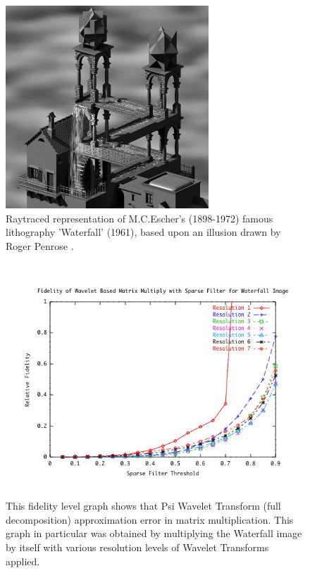 
\begin{figure}[ht]
\begin{center}\includegraphics [width=3in]{waterfall.jpg}\end{center}
\caption{Raytraced representation of M.C.Escher's (1898-1972) famous lithography
'Waterfall' (1961), based upon an illusion drawn by
Roger Penrose \cite{waterfall}. }
\label{imagewaterfall}
\end{figure}
\begin{figure}[ht]
\begin{center}\includegraphics [width=5in]{waterfallResultsA.jpg}\end{center}
\caption{This fidelity level graph shows that Psi Wavelet Transform (full decomposition) approximation error in matrix multiplication.  This graph in particular was obtained by multiplying the Waterfall image by itself with various resolution levels of Wavelet Transforms applied.  \cite{waterfall}  }
\label{imagewaterfallFidelity}
\end{figure}

